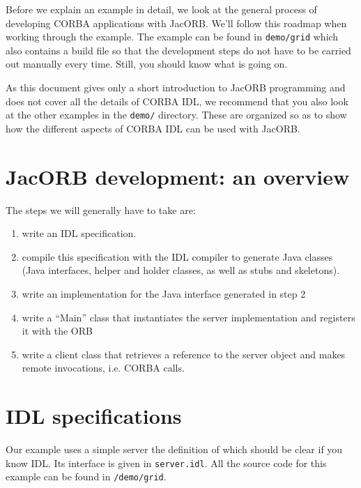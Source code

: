 
Before we explain an example in detail, we look at the general process
of developing CORBA applications with JacORB. We'll follow this
roadmap when working through the example.  The example can be found in
{\tt demo/grid} which also contains a build file so that the
development steps do not have to be carried out manually every time.
Still, you should know what is going on.

As this document gives only a short introduction to JacORB programming
and does not cover all the details of CORBA IDL, we recommend that you
also look at the other examples in the {\tt demo/} directory.  These
are organized so as to show how the different aspects of CORBA IDL can
be used with JacORB.

\section{JacORB development: an overview}

The steps we will generally have to take are:

\begin{enumerate}
    \item  write an IDL specification.
    \item compile this specification with the IDL compiler to generate
      Java classes (Java interfaces, helper and holder classes, as
      well as stubs and skeletons).
    \item write an implementation for the Java interface generated in step 2
    \item write a ``Main'' class that instantiates the server implementation
        and registers it with the ORB
    \item write a client class that retrieves a reference to the
    server object and makes remote invocations, i.e. CORBA calls.
\end{enumerate}


\section{IDL specifications}

Our example uses a simple server the definition of which should be
clear if you know IDL. Its interface is given in {\tt server.idl}. All
the source code for this example can be found in {\tt \JacORBDir/demo/grid}.

